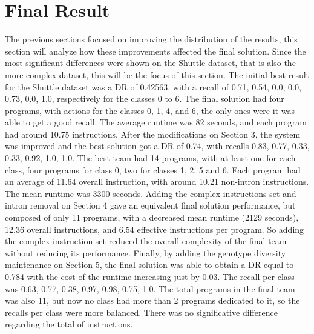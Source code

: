 \documentclass[journal]{IEEEtran}
\begin{document}
\section{Final Result}
The previous sections focused on improving the distribution of the results, this section will analyze how these improvements affected the final solution. Since the most significant differences were shown on the Shuttle dataset, that is also the more complex dataset, this will be the focus of this section. The initial best result for the Shuttle dataset was a DR of 0.42563, with a recall of 0.71, 0.54, 0.0, 0.0, 0.73, 0.0, 1.0, respectively for the classes 0 to 6. The final solution had four programs, with actions for the classes 0, 1, 4, and 6, the only ones were it was able to get a good recall. The average runtime was 82 seconds, and each program had around 10.75 instructions. After the modifications on Section 3, the system was improved and the best solution got a DR of 0.74, with recalls 0.83, 0.77, 0.33, 0.33, 0.92, 1.0, 1.0. The best team had 14 programs, with at least one for each class, four programs for class 0, two for classes 1, 2, 5 and 6. Each program had an average of 11.64 overall instruction, with around 10.21 non-intron instructions. The mean runtime was 3300 seconds. Adding the complex instructions set and intron removal on Section 4 gave an equivalent final solution performance, but composed of only 11 programs, with a decreased mean runtime (2129 seconds), 12.36 overall instructions, and 6.54 effective instructions per program. So adding the complex instruction set reduced the overall complexity of the final team without reducing its performance. Finally, by adding the genotype diversity maintenance on Section 5, the final solution was able to obtain a DR equal to 0.784 with the cost of the runtime increasing just by 0.03. The recall per class was 0.63, 0.77, 0.38, 0.97, 0.98, 0.75, 1.0. The total programs in the final team was also 11, but now no class had more than 2 programs dedicated to it, so the recalls per class were more balanced. There was no significative difference regarding the total of instructions.
\end{document}
